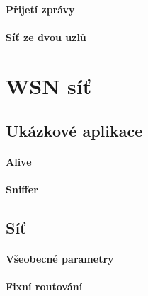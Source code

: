 \documentclass[12pt,titlepage]{article}
\begin{document}
		\paragraph{Přijetí zprávy}
		\paragraph{Síť ze dvou uzlů}
	
\section{WSN síť}
	\subsection{Ukázkové aplikace}
		\paragraph{Alive}
		\paragraph{Sniffer}
	 
	\subsection{Síť}
		\paragraph{Všeobecné parametry}
		\paragraph{Fixní routování}
	
\end{document}

